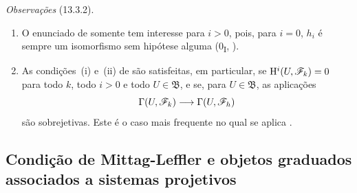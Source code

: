 \begin{env}[13.3.2]
\label{0.13.3.2}
\emph{Observações} (13.3.2).
\begin{enumerate}
  \item[{\rm(i)}]
  O enunciado de  somente tem interesse para $i>0$,
  pois, para $i=0$, $h_i$ é sempre um isomorfismo sem hipótese
  alguma (0\textsubscript{I}, ).

  \item[{\rm(ii)}]
  As condições~{\rm(i)} e~{\rm(ii)} de  são satisfeitas,
  em particular, se
  $\mathrm{H}^i(U,\mathscr{F}_k)=0$ para todo $k$, todo $i>0$ e todo
  $U\in\mathfrak{B}$, e se, para $U\in\mathfrak{B}$, as aplicações
  \[
    \Gamma(U,\mathscr{F}_k)\longrightarrow\Gamma(U,\mathscr{F}_h)
  \]
  são sobrejetivas. Este é o caso mais frequente no qual se aplica
  .
\end{enumerate}
\end{env}

\subsection{Condição de Mittag-Leffler e objetos graduados associados a sistemas projetivos}
\label{subsection:0.13.4}
\label{0.13.4}

